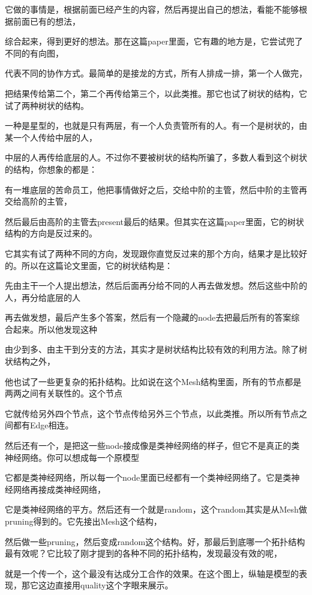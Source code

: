 \documentclass[12pt,a4paper]{article}
\begin{document}
它做的事情是，根据前面已经产生的内容，然后再提出自己的想法，看能不能够根据前面已有的想法，

综合起来，得到更好的想法。那在这篇paper里面，它有趣的地方是，它尝试兜了不同的有向图，

代表不同的协作方式。最简单的是接龙的方式，所有人排成一排，第一个人做完，

把结果传给第二个，第二个再传给第三个，以此类推。那它也试了树状的结构，它试了两种树状的结构。

一种是星型的，也就是只有两层，有一个人负责管所有的人。有一个是树状的，由某一个人传给中层的人，

中层的人再传给底层的人。不过你不要被树状的结构所骗了，多数人看到这个树状的结构，你想象的都是：

有一堆底层的苦命员工，他把事情做好之后，交给中阶的主管，然后中阶的主管再交给高阶的主管，

然后最后由高阶的主管去present最后的结果。但其实在这篇paper里面，它的树状结构的方向是反过来的。

它其实有试了两种不同的方向，发现跟你直觉反过来的那个方向，结果才是比较好的。所以在这篇论文里面，它的树状结构是：

先由主干一个人提出想法，然后后面再分给不同的人再去做发想。然后这些中阶的人，再分给底层的人

再去做发想，最后产生多个答案，然后有一个隐藏的node去把最后所有的答案综合起来。所以他发现这种

由少到多、由主干到分支的方法，其实才是树状结构比较有效的利用方法。除了树状结构之外，

他也试了一些更复杂的拓扑结构。比如说在这个Mesh结构里面，所有的节点都是两两之间有关联性的。这个节点

它就传给另外四个节点，这个节点传给另外三个节点，以此类推。所以所有节点之间都有Edge相连。

然后还有一个，是把这一些node接成像是类神经网络的样子，但它不是真正的类神经网络。你可以想成每一个原模型

它都是类神经网络，所以每一个node里面已经都有一个类神经网络了。它是类神经网络再接成类神经网络，

它是类神经网络的平方。然后还有一个就是random，这个random其实是从Mesh做pruning得到的。它先接出Mesh这个结构，

然后做一些pruning，然后变成random这个结构。好，那最后到底哪一个拓扑结构最有效呢？它比较了刚才提到的各种不同的拓扑结构，发现最没有效的呢，

就是一个传一个，这个最没有达成分工合作的效果。在这个图上，纵轴是模型的表现，那它这边直接用quality这个字眼来展示。
\end{document}
